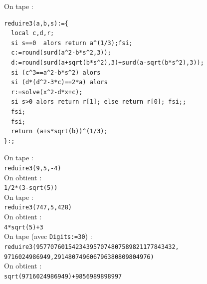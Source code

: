\documentclass[a4paper,11pt]{book}
\begin{document}
On tape :\\
\begin{verbatim}
reduire3(a,b,s):={
  local c,d,r;
  si s==0  alors return a^(1/3);fsi;
  c:=round(surd(a^2-b*s^2,3));
  d:=round(surd(a+sqrt(b*s^2),3)+surd(a-sqrt(b*s^2),3));
  si (c^3==a^2-b*s^2) alors
  si (d*(d^2-3*c)==2*a) alors
  r:=solve(x^2-d*x+c);
  si s>0 alors return r[1]; else return r[0]; fsi;;
  fsi;
  fsi;
  return (a+s*sqrt(b))^(1/3);
}:;
\end{verbatim}
On tape  :\\
{\tt reduire3(9,5,-4)}\\
On obtient :\\
{\tt 1/2*(3-sqrt(5))}\\
On tape  :\\
{\tt reduire3(747,5,428)}\\
On obtient :\\
{\tt 4*sqrt(5)+3}\\
On tape (avec {\tt Digits:=30}) :\\
{\tt reduire3(957707601542343957074807589821177843432,
  9716024986949,291480749606796380809804976)}\\
On obtient :\\
{\tt sqrt(9716024986949)+9856989898997}
\end{document}
